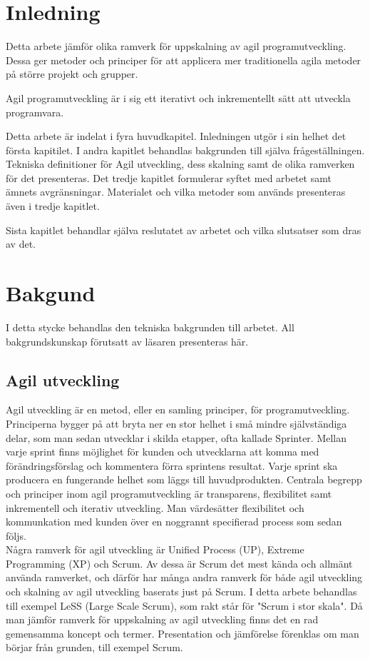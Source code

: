 \section{Inledning}
	
	Detta arbete jämför olika ramverk för uppskalning av agil programutveckling. Dessa ger metoder och principer för att applicera mer traditionella agila metoder på större projekt och grupper.
	
	Agil programutveckling är i sig ett iterativt och inkrementellt sätt att utveckla programvara.
	
	Detta arbete är indelat i fyra huvudkapitel. Inledningen utgör i sin helhet det första kapitilet.
	I andra kapitlet behandlas bakgrunden till själva frågeställningen. Tekniska definitioner för Agil utveckling, dess skalning samt de olika ramverken för det presenteras. 
	Det tredje kapitlet formulerar syftet med arbetet samt ämnets avgränsningar. Materialet och vilka metoder som används presenteras även i tredje kapitlet.
	
	Sista kapitlet behandlar själva reslutatet av arbetet och vilka slutsatser som dras av det.
	
\newpage
\section{Bakgund} 	
	
	
	I detta stycke behandlas den tekniska bakgrunden till arbetet. All bakgrundskunskap förutsatt av läsaren presenteras här.
	
	\subsection{Agil utveckling}
	
	Agil utveckling är en metod, eller en samling principer, för programutveckling. Principerna bygger på att bryta ner en stor helhet i små mindre självständiga delar, som man sedan utvecklar i skilda etapper, ofta kallade Sprinter.
	Mellan varje sprint finns möjlighet för kunden och utvecklarna att komma med förändringsförslag och kommentera förra sprintens resultat. Varje sprint ska producera en fungerande helhet som läggs till huvudprodukten. Centrala begrepp och principer inom agil programutveckling är transparens, flexibilitet samt inkrementell och iterativ utveckling. Man värdesätter flexibilitet och kommunkation med kunden över en noggrannt specifierad process som sedan följs. \cite{agile_manifesto}
	\\
	Några ramverk för agil utveckling är Unified Process (UP), Extreme Programming (XP) och Scrum.
	Av dessa är Scrum det mest kända och allmänt använda ramverket, och därför har många andra ramverk för både agil utveckling och skalning av agil utveckling baserats just på Scrum. I detta arbete behandlas till exempel LeSS (Large Scale Scrum), som rakt står för "Scrum i stor skala".
	Då man jämför ramverk för uppskalning av agil utveckling finns det en rad gemensamma koncept och termer. Presentation och jämförelse förenklas om man börjar från grunden, till exempel Scrum.
	
